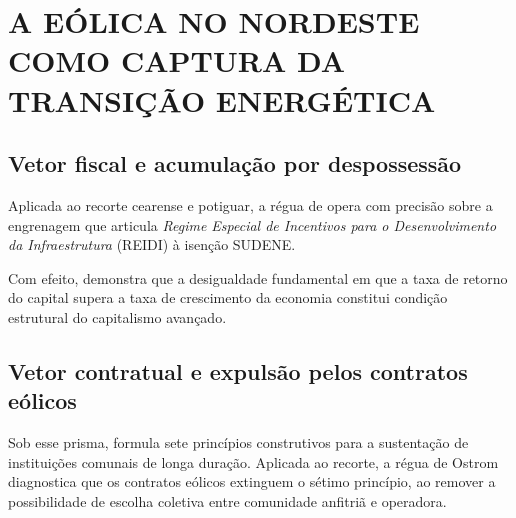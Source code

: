 
\section{\MakeUppercase{A eólica no Nordeste como captura da transição energética}}

\subsection{Vetor fiscal e acumulação por despossessão}

Aplicada ao recorte cearense e potiguar, a régua de  opera com precisão sobre a engrenagem que articula \textit{Regime Especial de Incentivos para o Desenvolvimento da Infraestrutura} (REIDI) à isenção SUDENE.

Com efeito,  demonstra que a desigualdade fundamental em que a taxa de retorno do capital supera a taxa de crescimento da economia constitui condição estrutural do capitalismo avançado.

\subsection{Vetor contratual e expulsão pelos contratos eólicos}

Sob esse prisma,  formula sete princípios construtivos para a sustentação de instituições comunais de longa duração. Aplicada ao recorte, a régua de Ostrom diagnostica que os contratos eólicos extinguem o sétimo princípio, ao remover a possibilidade de escolha coletiva entre comunidade anfitriã e operadora.
